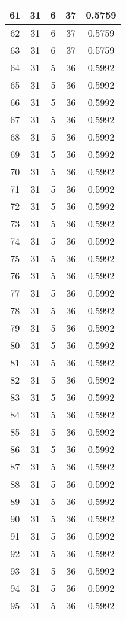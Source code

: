 \documentclass[letterpaper, 12pt]{article}
\begin{document}
\begin{longtable}{|c|c|c|c|c|}
61 & 31 & 6 & 37 & 0.5759 \\
\hline
62 & 31 & 6 & 37 & 0.5759 \\
\hline
63 & 31 & 6 & 37 & 0.5759 \\
\hline
64 & 31 & 5 & 36 & 0.5992 \\
\hline
65 & 31 & 5 & 36 & 0.5992 \\
\hline
66 & 31 & 5 & 36 & 0.5992 \\
\hline
67 & 31 & 5 & 36 & 0.5992 \\
\hline
68 & 31 & 5 & 36 & 0.5992 \\
\hline
69 & 31 & 5 & 36 & 0.5992 \\
\hline
70 & 31 & 5 & 36 & 0.5992 \\
\hline
71 & 31 & 5 & 36 & 0.5992 \\
\hline
72 & 31 & 5 & 36 & 0.5992 \\
\hline
73 & 31 & 5 & 36 & 0.5992 \\
\hline
74 & 31 & 5 & 36 & 0.5992 \\
\hline
75 & 31 & 5 & 36 & 0.5992 \\
\hline
76 & 31 & 5 & 36 & 0.5992 \\
\hline
77 & 31 & 5 & 36 & 0.5992 \\
\hline
78 & 31 & 5 & 36 & 0.5992 \\
\hline
79 & 31 & 5 & 36 & 0.5992 \\
\hline
80 & 31 & 5 & 36 & 0.5992 \\
\hline
81 & 31 & 5 & 36 & 0.5992 \\
\hline
82 & 31 & 5 & 36 & 0.5992 \\
\hline
83 & 31 & 5 & 36 & 0.5992 \\
\hline
84 & 31 & 5 & 36 & 0.5992 \\
\hline
85 & 31 & 5 & 36 & 0.5992 \\
\hline
86 & 31 & 5 & 36 & 0.5992 \\
\hline
87 & 31 & 5 & 36 & 0.5992 \\
\hline
88 & 31 & 5 & 36 & 0.5992 \\
\hline
89 & 31 & 5 & 36 & 0.5992 \\
\hline
90 & 31 & 5 & 36 & 0.5992 \\
\hline
91 & 31 & 5 & 36 & 0.5992 \\
\hline
92 & 31 & 5 & 36 & 0.5992 \\
\hline
93 & 31 & 5 & 36 & 0.5992 \\
\hline
94 & 31 & 5 & 36 & 0.5992 \\
\hline
95 & 31 & 5 & 36 & 0.5992 \\

\end{longtable}
\end{document}
